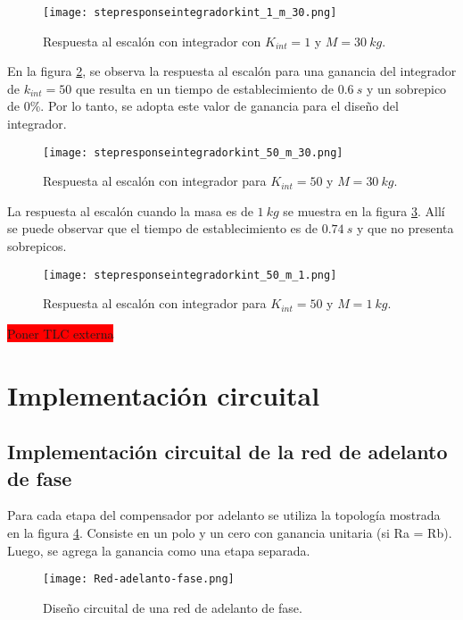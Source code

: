 \begin{figure}[H]
	\centering
	\texttt{[image: stepresponseintegradorkint\_1\_m\_30.png]}
	\caption{Respuesta al escalón con integrador con $K_{int} =1$ y $M=30\:kg$.}
	\label{fig:respuesta-al-escalon-con-k-1-M-30-analog}
\end{figure}

\noindent En la figura \ref{fig:respuesta-al-escalon-con-k-50-M-30}, se observa la respuesta al escalón para una ganancia del integrador de $k_{int}=50$ que resulta en un tiempo de establecimiento de $0.6\:s$ y un sobrepico de 0\%. Por lo tanto, se adopta este valor de ganancia para el diseño del integrador.

\begin{figure}[H]
	\centering
	\texttt{[image: stepresponseintegradorkint\_50\_m\_30.png]}
	\caption{Respuesta al escalón con integrador para $K_{int}=50$ y $M = 30\:kg$.}
	\label{fig:respuesta-al-escalon-con-k-50-M-30}
\end{figure}

\noindent La respuesta al escal\'{o}n cuando la masa es de $1 \:kg$ se muestra en la figura \ref{fig:respuesta-al-escalon-con-k-50-M-1}. All\'{i} se puede observar que el tiempo de establecimiento es de $0.74\:s$ y que no presenta sobrepicos.

\begin{figure}[H]
	\centering
	\texttt{[image: stepresponseintegradorkint\_50\_m\_1.png]}
	\caption{Respuesta al escalón con integrador para $K_{int} =50$ y $M = 1 \:kg$.}
	\label{fig:respuesta-al-escalon-con-k-50-M-1}
\end{figure}

\colorbox{red}{Poner TLC externa}

\section{Implementación circuital}

\subsection{Implementación circuital de la red de adelanto de fase}

\noindent Para cada etapa del compensador por adelanto se utiliza la topología mostrada en la figura \ref{fig:red-adelanto-fase}. Consiste en  un polo y un cero con ganancia unitaria (si Ra = Rb). Luego, se agrega la ganancia como una etapa separada.

\begin{figure}[H]
	\centering
	\texttt{[image: Red-adelanto-fase.png]}
	\caption{Diseño circuital de una red de adelanto de fase.}
	\label{fig:red-adelanto-fase}
\end{figure}

